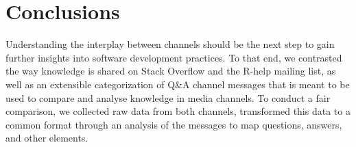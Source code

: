 \documentclass{sig-alternate-05-2015}
\begin{document}



\section{Conclusions}
\label{cha:conclusion}

	Understanding the interplay between channels should be the next step to gain further insights into software development practices.
	To that end, we contrasted the way knowledge is shared on Stack Overflow and the R-help mailing list, as well as an extensible categorization of Q\&A channel messages that is meant to be used to compare and analyse knowledge in media channels.
	To conduct a fair comparison, we collected raw data from both channels, transformed this data to a common format through an analysis of the messages to map questions, answers, and other elements.
\end{document}
